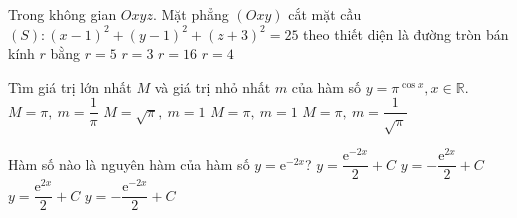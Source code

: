 \begin{ex}%
	Trong không gian $Oxyz$. Mặt phẳng $(Oxy)$ cắt mặt cầu $(S)\colon (x-1)^2+(y-1)^2+(z+3)^2=25$ theo thiết diện là đường tròn bán kính $r$ bằng
	\choice
	{$r=5$  }
	{$r=3$  }
	{$r=16$  }
	{\True $r=4$ }
\end{ex}
\begin{ex}%
	Tìm giá trị lớn nhất $M$ và giá trị nhỏ nhất $m$ của hàm số $y=\pi^{\cos x }, x\in \mathbb{R}$.
	\choice
	{ \True $M=\pi,\: m=\dfrac{1}{\pi}$ }
	{$M=\sqrt{\pi},\: m=1$  }
	{$M=\pi, \: m=1$  }
	{$M=\pi, \: m=\dfrac{1}{\sqrt{\pi}}$  }
\end{ex}
\begin{ex}%
	Hàm số nào là nguyên hàm của hàm số $y=\mathrm{e}^{-2x}$?
	\choice
	{$y=\dfrac{\mathrm{e}^{-2x}}{2}+C$  }
	{$y=-\dfrac{\mathrm{e}^{2x}}{2}+C$  }
	{$y=\dfrac{\mathrm{e}^{2x}}{2}+C$  }
	{ \True $y=-\dfrac{\mathrm{e}^{-2x}}{2} +C$}
\end{ex}
